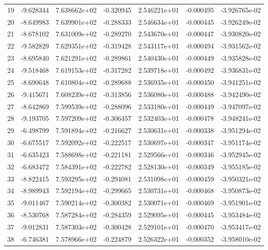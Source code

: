 \begin{tabular}{rrrrrrr}
  19 &  -9.628344 &  7.638662e+02 & -0.320945 &  2.546221e+01 &   -0.000495 & -3.926765e-02 \\
  20 &  -8.649983 &  7.639901e+02 & -0.288333 &  2.546634e+01 &   -0.000445 & -3.926249e-02 \\
  21 &  -8.678102 &  7.631009e+02 & -0.289270 &  2.543670e+01 &   -0.000447 & -3.930820e-02 \\
  22 &  -9.582829 &  7.629351e+02 & -0.319428 &  2.543117e+01 &   -0.000494 & -3.931562e-02 \\
  23 &  -8.695840 &  7.621291e+02 & -0.289861 &  2.540430e+01 &   -0.000449 & -3.935828e-02 \\
  24 &  -9.518468 &  7.619153e+02 & -0.317282 &  2.539718e+01 &   -0.000492 & -3.936831e-02 \\
  25 &  -8.690648 &  7.610804e+02 & -0.289688 &  2.536935e+01 &   -0.000450 & -3.941251e-02 \\
  26 &  -9.415671 &  7.608239e+02 & -0.313856 &  2.536080e+01 &   -0.000488 & -3.942490e-02 \\
  27 &  -8.642869 &  7.599539e+02 & -0.288096 &  2.533180e+01 &   -0.000449 & -3.947097e-02 \\
  28 &  -9.193705 &  7.597209e+02 & -0.306457 &  2.532403e+01 &   -0.000478 & -3.948241e-02 \\
  29 &  -6.498799 &  7.591894e+02 & -0.216627 &  2.530631e+01 &   -0.000338 & -3.951294e-02 \\
  30 &  -6.675517 &  7.592092e+02 & -0.222517 &  2.530697e+01 &   -0.000347 & -3.951174e-02 \\
  31 &  -6.635423 &  7.588698e+02 & -0.221181 &  2.529566e+01 &   -0.000346 & -3.952945e-02 \\
  32 &  -6.683472 &  7.584391e+02 & -0.222782 &  2.528130e+01 &   -0.000349 & -3.955185e-02 \\
  33 &  -8.822415 &  7.593295e+02 & -0.294081 &  2.531098e+01 &   -0.000459 & -3.950321e-02 \\
  34 &  -8.989943 &  7.592194e+02 & -0.299665 &  2.530731e+01 &   -0.000468 & -3.950873e-02 \\
  35 &  -9.011467 &  7.590214e+02 & -0.300382 &  2.530071e+01 &   -0.000469 & -3.951901e-02 \\
  36 &  -8.530768 &  7.587284e+02 & -0.284359 &  2.529095e+01 &   -0.000445 & -3.953484e-02 \\
  37 &  -9.012831 &  7.587303e+02 & -0.300428 &  2.529101e+01 &   -0.000470 & -3.953417e-02 \\
  38 &  -6.746381 &  7.578966e+02 & -0.224879 &  2.526322e+01 &   -0.000352 & -3.958010e-02 \\

\end{tabular}
